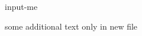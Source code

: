 \documentclass[10pt]{article}
\begin{document}
{input-me}

some additional text only in new file
\end{document}
